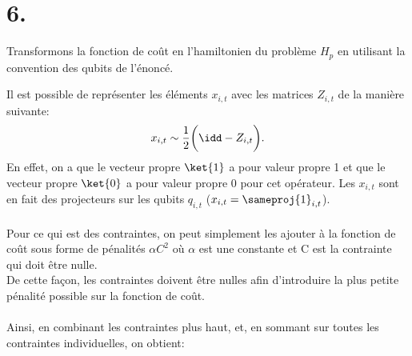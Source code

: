 \documentclass{article}
\begin{document}
\section*{6.}
Transformons la fonction de coût en l'hamiltonien du problème $H_p$ en utilisant la convention des qubits de l'énoncé.

Il est possible de représenter les éléments $x_{i,t}$ avec les matrices $Z_{i,t}$ de la manière suivante:
\begin{equation*}
    x_{i,t}\sim \frac{1}{2}\bigg(\idd-Z_{i,t}\bigg).
\end{equation*}
En effet, on a que le vecteur propre $\ket{1}$ a pour valeur propre 1 et que le vecteur propre $\ket{0}$ a pour valeur propre 0 pour cet opérateur. Les $x_{i, t}$ sont en fait des projecteurs sur les qubits $q_{i, t}$ ($x_{i, t}= \sameproj{1}_{i, t}$).
\\\\
Pour ce qui est des contraintes, on peut simplement les ajouter à la fonction de coût sous forme de pénalités $\alpha C^2$ où $\alpha$ est une constante et C est la contrainte qui doit être nulle. 
\\
De cette façon, les contraintes doivent être nulles afin d'introduire la plus petite pénalité possible sur la fonction de coût.
\\\\
Ainsi, en combinant les contraintes plus haut, et, en sommant sur toutes les contraintes individuelles, on obtient:
\end{document}
